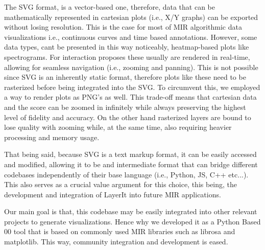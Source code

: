 The SVG format, is a vector-based one, therefore, data that can be mathematically represented in cartesian plots (i.e., X/Y graphs) can be exported without losing resolution. This is the case for most of MIR algorithmic data visualizations i.e., continuous curves and time based annotations. However, some data types, cant be presented in this way noticeably, heatmap-based plots like spectrograms. For interaction proposes these usually are rendered in real-time, allowing for seamless navigation (i.e., zooming and panning). This is not possible since SVG is an inherently static format, therefore plots like these need to be rasterized before being integrated into the SVG. To circumvent this, we employed a way to render plots as PNG's as well. This trade-off means that cartesian data and the score can be zoomed in infinitely while always preserving the highest level of fidelity and accuracy. On the other hand rasterized layers are bound to lose quality with zooming while, at the same time, also requiring heavier processing and memory usage. 

That being said, because SVG is a text markup format, it can be easily accessed and modified, allowing it to be and intermediate format that can bridge different codebases independently of their base language (i.e., Python, JS, C++ etc...). This also serves as a crucial value argument for this choice, this being, the development and integration of LayerIt into future MIR applications. 

Our main goal is that, this codebase may be easily integrated into other relevant projects to generate visualizations. Hence why we developed it as a Python Based 00 tool that is based on commonly used MIR libraries such as librosa and matplotlib. This way, community integration and development is eased. 